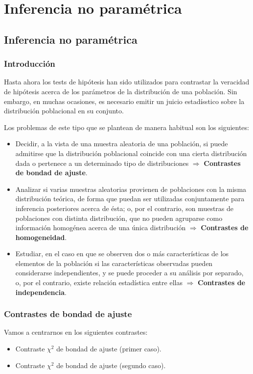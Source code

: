 \part{Inferencia no paramétrica}

\chapter{Inferencia no paramétrica}

\section{Introducción}

Hasta ahora los tests de hipótesis han sido utilizados para contrastar la veracidad de hipótesis acerca de los parámetros de la distribución de una población. Sin embargo,
en muchas ocasiones, es necesario emitir un juicio estadísstico sobre la distribución poblacional en su conjunto.

Los problemas de este tipo que se plantean de manera habitual son los siguientes:
\begin{itemize}
    \item Decidir, a la vista de una muestra aleatoria de una población, si puede admitirse que la distribución poblacional coincide con una cierta distribución dada o pertenece a un determinado tipo de distribuciones $\Rightarrow$ \textbf{Contrastes de bondad de ajuste}.
    \item Analizar si varias muestras aleatorias provienen de poblaciones con la misma distribución teórica, de forma que puedan ser utilizadas conjuntamente para inferencia posteriores acerca de ésta; o, por el contrario, son muestras de poblaciones con distinta distribución, que no pueden agruparse como información homogénea acerca de una única distribución $\Rightarrow$ \textbf{Contrastes de homogeneidad}.
    \item Estudiar, en el caso en que se observen dos o más características de los elementos de la población si las características observadas pueden considerarse independientes, y se puede proceder a su análisis por separado, o, por el contrario, existe relación estadística entre ellas $\Rightarrow$ \textbf{Contrastes de independencia}.
\end{itemize}

\section{Contrastes de bondad de ajuste}
Vamos a centrarnos en los siguientes contrastes:
\begin{itemize}
    \item Contraste $\chi^2$ de bondad de ajuste (primer caso).
    \item Contraste $\chi^2$ de bondad de ajuste (segundo caso).
\end{itemize}

